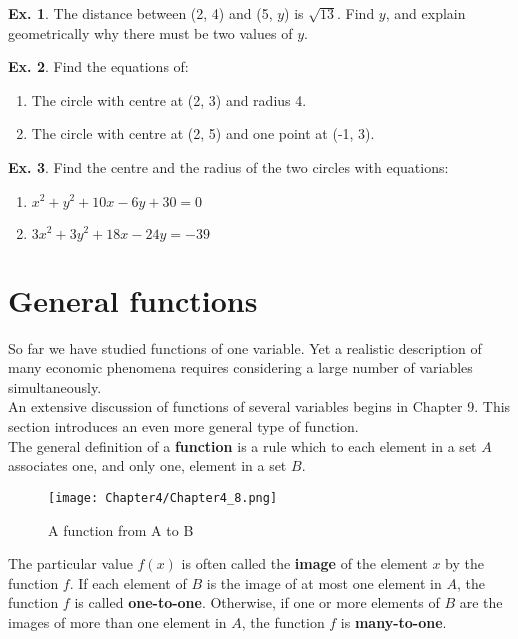 \documentclass[10pt,a4paper]{book}
\theoremstyle{definition}\newtheorem{definition}{Definition}
\theoremstyle{definition}\newtheorem{fact}{Fact}
\theoremstyle{definition}\newtheorem{ex}{Ex.}
\theoremstyle{definition}\newtheorem{project}{Project}
\theoremstyle{definition}\newtheorem{problem}{Problem}
\theoremstyle{definition}\newtheorem{example}{Example}
\numberwithin{theorem}{chapter}
\numberwithin{corollary}{chapter}
\numberwithin{assumption}{chapter}
\numberwithin{definition}{chapter}
\numberwithin{prop}{chapter}
\numberwithin{notation}{chapter}
\numberwithin{problem}{chapter}
\numberwithin{example}{chapter}
\numberwithin{fact}{chapter}
\numberwithin{ex}{chapter}
\begin{document}
	\begin{ex}
		The distance between (2, 4) and (5, $y$) is $\sqrt{13}$. Find $y$, and explain geometrically why there must be two values of $y$.
	\end{ex}
	
	\begin{ex}
		Find the equations of: 
		\begin{enumerate}[label=(\alph*)]
			\item The circle with centre at (2, 3) and radius 4.
			\item The circle with centre at (2, 5) and one point at (-1, 3).
		\end{enumerate}
	\end{ex}
	
	\begin{ex}
		Find the centre and the radius of the two circles with equations:
		\begin{enumerate}[label=(\alph*)]
			\item $x^2+y^2+10x-6y+30=0$
			\item $3x^2+3y^2+18x-24y=-39$
		\end{enumerate}
	\end{ex}
	
	\section{General functions}
	So far we have studied functions of one variable. Yet a realistic description of many economic phenomena requires considering a large number of variables simultaneously.
	\\
	An extensive discussion of functions of several variables begins in Chapter 9. This section introduces an even more general type of function.
	\\
	The general definition of a \textbf{function} is a rule which to each element in a set $A$ associates one, and only one, element in a set $B$.
	
	\begin{figure}
		\centering
		\texttt{[image: Chapter4/Chapter4\_8.png]}
		\caption{A function from A to B}
	\end{figure}
	
	The particular value $f (x)$ is often called the \textbf{image} of the element $x$ by the function $f$. If each element of $B$ is the image of at most one element in $A$, the function $f$ is called \textbf{one-to-one}. Otherwise, if one or more elements of $B$ are the images of more than one element in $A$, the function $f$ is \textbf{many-to-one}.
	
\end{document}
